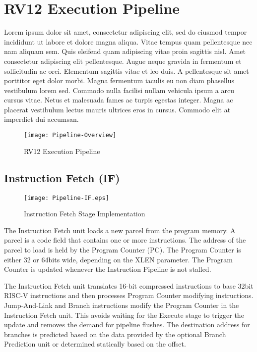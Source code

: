 \section{RV12 Execution Pipeline}

Lorem ipsum dolor sit amet, consectetur adipiscing elit, sed do eiusmod tempor incididunt ut labore et dolore magna aliqua. Vitae tempus quam pellentesque nec nam aliquam sem. Quis eleifend quam adipiscing vitae proin sagittis nisl. Amet consectetur adipiscing elit pellentesque. Augue neque gravida in fermentum et sollicitudin ac orci. Elementum sagittis vitae et leo duis. A pellentesque sit amet porttitor eget dolor morbi. Magna fermentum iaculis eu non diam phasellus vestibulum lorem sed. Commodo nulla facilisi nullam vehicula ipsum a arcu cursus vitae. Netus et malesuada fames ac turpis egestas integer. Magna ac placerat vestibulum lectus mauris ultrices eros in cursus. Commodo elit at imperdiet dui accumsan. 

\begin{figure}[h]
  \texttt{[image: Pipeline-Overview]}
  \caption{RV12 Execution Pipeline}
\end{figure}

\pagebreak

\subsection{Instruction Fetch (IF)}\label{instruction-fetch-if}

\begin{figure}[h]
  \texttt{[image: Pipeline-IF.eps]}
  \caption{Instruction Fetch Stage Implementation}
\end{figure}

The Instruction Fetch unit loads a new parcel from the program memory. A
parcel is a code field that contains one or more instructions. The
address of the parcel to load is held by the Program Counter (PC). The
Program Counter is either 32 or 64bits wide, depending on the XLEN
parameter. The Program Counter is updated whenever the Instruction
Pipeline is not stalled.

The Instruction Fetch unit translates 16-bit compressed instructions to
base 32bit RISC-V instructions and then processes Program Counter
modifying instructions. Jump-And-Link and Branch instructions modify the
Program Counter in the Instruction Fetch unit. This avoids waiting for
the Execute stage to trigger the update and removes the demand for
pipeline flushes. The destination address for branches is predicted
based on the data provided by the optional Branch Prediction unit or
determined statically based on the offset.

